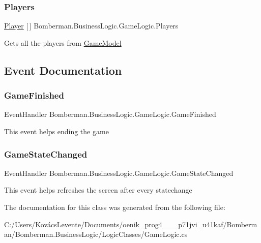 \subsubsection{\texorpdfstring{Players}{Players}}
{\footnotesize\ttfamily \mbox{\hyperlink{class_bomberman_1_1_model_1_1_player}{Player}} \mbox{[}$\,$\mbox{]} Bomberman.\+Business\+Logic.\+Game\+Logic.\+Players\hspace{0.3cm}{\ttfamily [get]}}



Gets all the players from \mbox{\hyperlink{class_bomberman_1_1_business_logic_1_1_game_model}{Game\+Model}} 



\subsection{Event Documentation}
\mbox{\label{class_bomberman_1_1_business_logic_1_1_game_logic_afac06eda1eedc3b5fb9574b8e8e56f0f}} 
\subsubsection{\texorpdfstring{GameFinished}{GameFinished}}
{\footnotesize\ttfamily Event\+Handler Bomberman.\+Business\+Logic.\+Game\+Logic.\+Game\+Finished}



This event helps ending the game 

\mbox{\label{class_bomberman_1_1_business_logic_1_1_game_logic_a7d6ca589e415c4ad23a0554fdfde91e4}} 
\subsubsection{\texorpdfstring{GameStateChanged}{GameStateChanged}}
{\footnotesize\ttfamily Event\+Handler Bomberman.\+Business\+Logic.\+Game\+Logic.\+Game\+State\+Changed}



This event helps refreshes the screen after every statechange 



The documentation for this class was generated from the following file\+:\begin{DoxyCompactItemize}
\item 
C\+:/\+Users/\+Kovács\+Levente/\+Documents/oenik\+\_\+prog4\+\_\+\_\+\_\+p71jvi\+\_\+u41kaf/\+Bomberman/\+Bomberman.\+Business\+Logic/\+Logic\+Classes/Game\+Logic.\+cs\end{DoxyCompactItemize}
